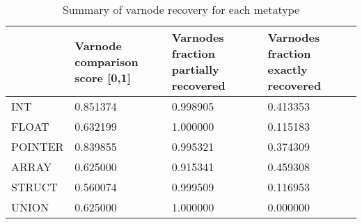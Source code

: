 \begin{table}[t]
\centering
\caption{Summary of varnode recovery for each metatype}
\label{table:metatype-recovery-summary}
\begin{tabular}{lp{6.0cm}p{6.0cm}p{6.0cm}}
\toprule
{} &  Varnode comparison score [0,1] &  Varnodes fraction partially recovered &  Varnodes fraction exactly recovered \\
\midrule
INT     &                        0.851374 &                               0.998905 &                             0.413353 \\
FLOAT   &                        0.632199 &                               1.000000 &                             0.115183 \\
POINTER &                        0.839855 &                               0.995321 &                             0.374309 \\
ARRAY   &                        0.625000 &                               0.915341 &                             0.459308 \\
STRUCT  &                        0.560074 &                               0.999509 &                             0.116953 \\
UNION   &                        0.625000 &                               1.000000 &                             0.000000 \\
\bottomrule
\end{tabular}
\end{table}
